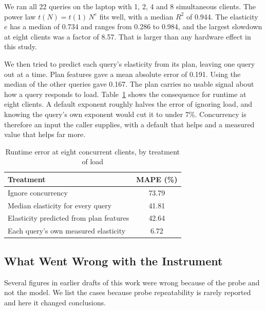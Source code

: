 \documentclass[runningheads]{llncs}
\begin{document}
We ran all 22 queries on the laptop with 1, 2, 4 and 8 simultaneous clients.
The power law $t(N) = t(1)\,N^{e}$ fits well, with a median $R^2$ of 0.944.
The elasticity $e$ has a median of 0.734 and ranges from 0.286 to 0.984, and
the largest slowdown at eight clients was a factor of 8.57. That is larger
than any hardware effect in this study.

We then tried to predict each query's elasticity from its plan, leaving one
query out at a time. Plan features gave a mean absolute error of 0.191. Using
the median of the other queries gave 0.167. The plan carries no usable signal
about how a query responds to load. Table~\ref{tab:conc} shows the
consequence for runtime at eight clients. A default exponent roughly halves
the error of ignoring load, and knowing the query's own exponent would cut it
to under 7\%. Concurrency is therefore an input the caller supplies, with a
default that helps and a measured value that helps far more.

\begin{table}[t]
\centering
\caption{Runtime error at eight concurrent clients, by treatment of load}
\label{tab:conc}
\begin{tabular}{lc}
\toprule
Treatment & MAPE (\%) \\
\midrule
Ignore concurrency & 73.79 \\
Median elasticity for every query & 41.81 \\
Elasticity predicted from plan features & 42.64 \\
Each query's own measured elasticity & 6.72 \\
\bottomrule
\end{tabular}
\end{table}

\subsection{What Went Wrong with the Instrument}
\label{sec:hygiene}

Several figures in earlier drafts of this work were wrong because of the
probe and not the model. We list the cases because probe repeatability is
rarely reported and here it changed conclusions.
\end{document}

